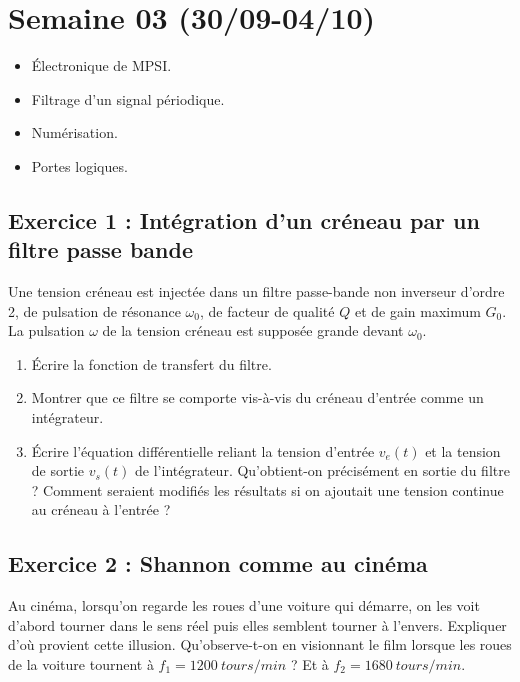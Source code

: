 \section{Semaine 03 (30/09-04/10) }


\begin{itemize}
	\item Électronique de MPSI.
	\item Filtrage d'un signal périodique.
	\item Numérisation.
	\item Portes logiques.
\end{itemize}

\subsection{Exercice 1 : Intégration d'un créneau par un filtre passe bande}

Une tension créneau est injectée dans un filtre passe-bande non inverseur d'ordre 2, de pulsation de résonance $\omega_0$, de facteur de qualité $Q$ et de gain maximum $G_0$. La pulsation $\omega$ de la tension créneau est supposée grande devant $\omega_0$.

\begin{enumerate}
	\item Écrire la fonction de transfert du filtre.
	\item Montrer que ce filtre se comporte vis-à-vis du créneau d'entrée comme un intégrateur.
	\item Écrire l'équation différentielle reliant la tension d'entrée $v_e(t)$ et la tension de sortie $v_s(t)$ de l'intégrateur. Qu'obtient-on précisément en sortie du filtre ? Comment seraient modifiés les résultats si on ajoutait une tension continue au créneau à l'entrée ?
\end{enumerate}

\subsection{Exercice 2 : Shannon comme au cinéma}

Au cinéma, lorsqu'on regarde les roues d'une voiture qui démarre, on les voit d'abord tourner dans le sens réel puis elles semblent tourner à l'envers. Expliquer d'où provient cette illusion. Qu'observe-t-on en visionnant le film lorsque les roues de la voiture tournent à $f_1=\SI{1200}{tours/min}$ ? Et à $f_2 = \SI{1680}{tours/min}$.

